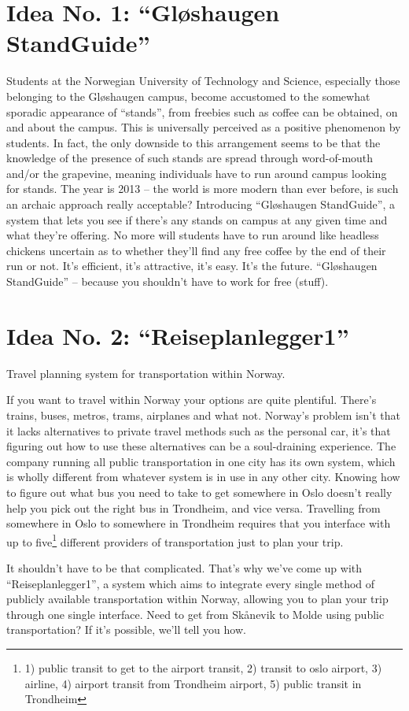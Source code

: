 \section{Idea No. 1: ``Gløshaugen StandGuide''}
	Students at the Norwegian University of Technology and Science, 
	especially those belonging to the Gløshaugen campus, 
	become accustomed to the somewhat sporadic appearance of ``stands'', 
	from freebies such as coffee can be obtained, on and about the campus.
	This is universally perceived as a positive phenomenon by students.
	In fact, the only downside to this arrangement seems to be that the knowledge of the presence of such stands are spread through word-of-mouth and/or the grapevine,
	meaning individuals have to run around campus looking for stands.
	The year is 2013 -- the world is more modern than ever before, 
	is such an archaic approach really acceptable?
	Introducing ``Gløshaugen StandGuide'', a system that lets you see if there's any stands on campus at any given time and what they're offering.
	No more will students have to run around like headless chickens uncertain as to whether they'll find any free coffee by the end of their run or not.
	It's efficient, it's attractive, it's easy.
	It's the future.
	``Gløshaugen StandGuide'' -- because you shouldn't have to work for free (stuff).

\section{Idea No. 2: ``Reiseplanlegger1''}
	Travel planning system for transportation within Norway.

	If you want to travel within Norway your options are quite plentiful.
	There's trains, buses, metros, trams, airplanes and what not.
	Norway's problem isn't that it lacks alternatives to private travel methods such as the personal car, 
	it's that figuring out how to use these alternatives can be a soul-draining experience.
	The company running all public transportation in one city has its own system,
	which is wholly different from whatever system is in use in any other city.
	Knowing how to figure out what bus you need to take to get somewhere in Oslo doesn't really help you pick out the right bus in Trondheim, and vice versa.
	Travelling from somewhere in Oslo to somewhere in Trondheim requires that you interface with up to five\footnote{1) public transit to get to the airport transit, 2) transit to oslo airport, 3) airline, 4) airport transit from Trondheim airport, 5) public transit in Trondheim} different providers of transportation just to plan your trip.

	It shouldn't have to be that complicated.
	That's why we've come up with ``Reiseplanlegger1'',
	a system which aims to integrate every single method of publicly available transportation within Norway, 
	allowing you to plan your trip through one single interface. 
	Need to get from Skånevik to Molde using public transportation?
	If it's possible, we'll tell you how.